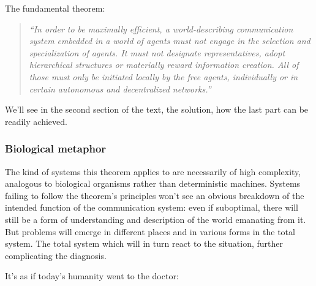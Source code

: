 \documentclass[11pt]{article}
\newenvironment{epigraphquote}
  {\begin{quote}\small\itshape}
  {\end{quote}}
\begin{document}
The fundamental theorem:

\begin{epigraphquote}
``In order to be maximally efficient, a world-describing communication system embedded
in a world of agents must not engage in the selection and specialization of agents. It
must not designate representatives, adopt hierarchical structures or materially reward
information creation. All of those must only be initiated locally by the free agents,
individually or in certain autonomous and decentralized networks.''
\end{epigraphquote}

We'll see in the second section of the text, the solution, how the last part can be
readily achieved.

\subsubsection*{Biological metaphor}

The kind of systems this theorem applies to are necessarily of high complexity,
analogous to biological organisms rather than deterministic machines. Systems failing to
follow the theorem's principles won't see an obvious breakdown of the intended function
of the communication system: even if suboptimal, there will still be a form of
understanding and description of the world emanating from it. But problems will emerge
in different places and in various forms in the total system. The total system which
will in turn react to the situation, further complicating the diagnosis.

It's as if today's humanity went to the doctor:
\end{document}
